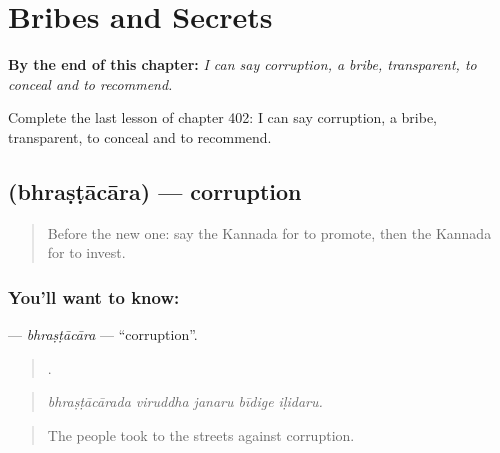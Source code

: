 
\chapter{Bribes and Secrets}
\label{ch:ka-bribes-and-secrets}

\begin{chapteropening}
\textbf{By the end of this chapter:} \emph{I can say corruption, a bribe, transparent, to conceal and to recommend.}

Complete the last lesson of chapter 402: I can say corruption, a bribe, transparent, to conceal and to recommend.
\end{chapteropening}

\section[\texorpdfstring{\kn{ಭ್ರಷ್ಟಾಚಾರ} (bhraṣṭācāra)}{ಭ್ರಷ್ಟಾಚಾರ (bhraṣṭācāra)}]{ (bhraṣṭācāra) — corruption}

\label{lesson:KA-C402-bhrastacara}



\begin{quote}
Before the new one: say the Kannada for to promote, then the Kannada for to invest.
\end{quote}

\subsection*{You'll want to know: }
\textbf{} — \emph{bhraṣṭācāra} — \textquotedblleft{}corruption\textquotedblright{}.

\begin{quote}
    .
\end{quote}

\begin{quote}
\emph{bhraṣṭācārada viruddha janaru bīdige iḷidaru.}
\end{quote}

\begin{quote}
The people took to the streets against corruption.
\end{quote}

